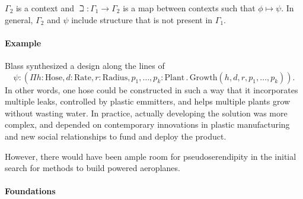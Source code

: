  $\Gamma_2$ is a context and $\beth : \Gamma_1 \rightarrow \Gamma_2$ is
 a map between contexts such that $\phi \mapsto \psi$.  In general,
 $\Gamma_2$ and $\psi$ include structure that is not present in
 $\Gamma_1$.

 \paragraph{\textbf{\upshape Example}}
 Blass synthesized a design along the lines of $$\psi : (\Pi
 h:\mathrm{Hose}, d:\mathrm{Rate}, r:\mathrm{Radius},
 p_1,\ldots,p_k:\mathrm{Plant} \mathbin{.}
 \mathrm{Growth}(h,d,r,p_1,\ldots,p_k)).$$ In other words, one hose
 could be constructed in such a way that it incorporates multiple
 leaks, controlled by plastic emmitters, and helps multiple plants grow
 without wasting water.  In practice, actually developing the solution
 was more complex, and depended on contemporary innovations in plastic
 manufacturing and new social relationships to fund and deploy the
 product.

 However, there would have been ample room for pseudoserendipity in
 the initial search for methods to build powered aeroplanes.
 \begin{center}
 \asterism
 \end{center}


 \paragraph{\textbf{\upshape Foundations}}
                                         
